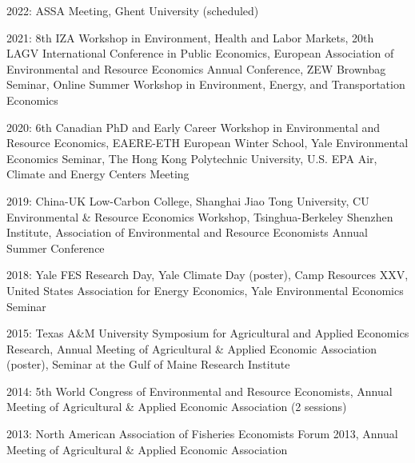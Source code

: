 

\begin{pubitems} %
	\item {2022: ASSA Meeting, Ghent University (scheduled)}
    \item {2021: 8th IZA Workshop in Environment, Health and Labor Markets, 20th LAGV International Conference in Public Economics, European Association of Environmental and Resource Economics Annual Conference, ZEW Brownbag Seminar, Online Summer Workshop in Environment, Energy, and Transportation Economics}
    \item {2020: 6th Canadian PhD and Early Career Workshop in Environmental and Resource Economics, EAERE-ETH European Winter School, Yale Environmental Economics Seminar, The Hong Kong Polytechnic University, U.S. EPA Air, Climate and Energy Centers Meeting}
    \item {2019: China-UK Low-Carbon College, Shanghai Jiao Tong University, CU Environmental \& Resource Economics Workshop, Tsinghua-Berkeley Shenzhen Institute, Association of Environmental and Resource Economists Annual Summer Conference}
    \item {2018: Yale FES Research Day, Yale Climate Day (poster), Camp Resources XXV, United States Association for Energy Economics, Yale Environmental Economics Seminar}
    \item {2015: Texas A\&M University Symposium for Agricultural and Applied Economics Research, Annual Meeting of Agricultural \& Applied Economic Association (poster), Seminar at the Gulf of Maine Research Institute}
    \item {2014: 5th World Congress of Environmental and Resource Economists, Annual Meeting of Agricultural \& Applied Economic Association (2 sessions)}
    \item {2013: North American Association of Fisheries Economists Forum 2013, Annual Meeting of Agricultural \& Applied Economic Association}
\end{pubitems}
